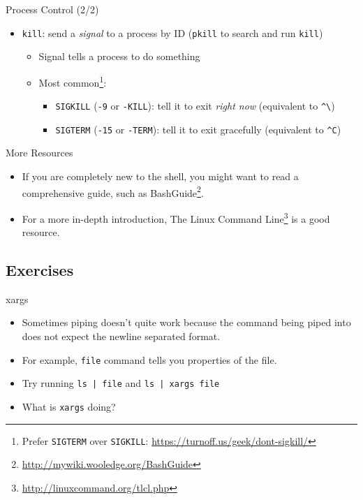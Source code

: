 \documentclass[12pt]{beamer}
\begin{document}
\begin{frame}[fragile]{Process Control (2/2)}
  \begin{itemize}
    \item \texttt{kill}: send a \emph{signal} to a process by ID (\texttt{pkill} to search and run \texttt{kill})
          \begin{itemize}
            \item Signal tells a process to do something
            \item Most common\footnote{Prefer \texttt{SIGTERM} over \texttt{SIGKILL}: \url{https://turnoff.us/geek/dont-sigkill/}}:
                  \begin{itemize}
                    \item \texttt{SIGKILL} (\texttt{-9} or \texttt{-KILL}): tell it to exit \emph{right now} (equivalent to \texttt{\^{}\textbackslash})
                    \item \texttt{SIGTERM} (\texttt{-15} or \texttt{-TERM}): tell it to exit gracefully (equivalent to \texttt{\^{}C})
                  \end{itemize}
          \end{itemize}
  \end{itemize}
\end{frame}

\begin{frame}{More Resources}
  \begin{itemize}
    \item If you are completely new to the shell, you might want to read a comprehensive guide, such as BashGuide\footnote{\url{http://mywiki.wooledge.org/BashGuide}}.
    \item For a more in-depth introduction, The Linux Command Line\footnote{\url{http://linuxcommand.org/tlcl.php}} is a good resource.
  \end{itemize}
\end{frame}

\subsection{Exercises}
\begin{frame}{xargs}
  \begin{itemize}
    \item Sometimes piping doesn't quite work because the command being piped into does not expect the newline separated format.
    \item For example, \texttt{file} command tells you properties of the file.
    \item Try running \texttt{ls | file} and \texttt{ls | xargs file}
    \item What is \texttt{xargs} doing?
  \end{itemize}
\end{frame}
\end{document}
